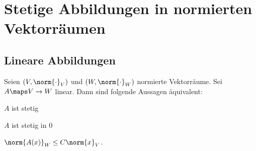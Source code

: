 \section*{Stetige Abbildungen in normierten Vektorräumen}
\subsection*{Lineare Abbildungen}
\begin{satz}\label{lineare_abbildung:stetigkeitssatz}
    Seien \( (V,\norm{\cdot}_{V}) \) und \( (W,\norm{\cdot}_{W}) \) normierte Vektorräume.
    Sei \( A\maps V\to W \) linear.
    Dann sind folgende Aussagen äquivalent:
    \begin{eigenschaftenenumerate}
        \item \label{lineare_abbildung:stetigkeitssatz:stetig} \( A \) ist stetig
        \item \label{lineare_abbildung:stetigkeitssatz:stetig_in_null} \( A \) ist stetig in \( 0 \)
        \item \label{lineare_abbildung:stetigkeitssatz:norm_beschraenkt} \( \norm{A(x)}_{W}\leq C\norm{x}_{V} \).
    \end{eigenschaftenenumerate}
    
\end{satz}
